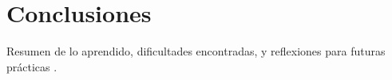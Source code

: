
\section{Conclusiones}
Resumen de lo aprendido, dificultades encontradas, y reflexiones para futuras prácticas \cite{Blokhin2017}.